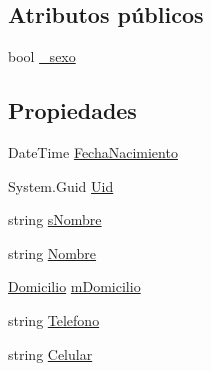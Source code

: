 \subsection*{Atributos públicos}
\begin{DoxyCompactItemize}
\item 
bool \hyperlink{class_proyecto___integrador__3_1_1_tipos_dato_1_1_usuario_a1a0f91fb9a1e9b12a534a31295531498}{\-\_\-sexo}
\end{DoxyCompactItemize}
\subsection*{Propiedades}
\begin{DoxyCompactItemize}
\item 
Date\-Time \hyperlink{class_proyecto___integrador__3_1_1_tipos_dato_1_1_usuario_acb7c4051a5323df336c32d932b5e83bb}{Fecha\-Nacimiento}
\item 
System.\-Guid \hyperlink{class_proyecto___integrador__3_1_1_tipos_dato_1_1_usuario_ae9cfa8c8b462028b8c166f7a1eff5f1f}{Uid}
\item 
string \hyperlink{class_proyecto___integrador__3_1_1_tipos_dato_1_1_usuario_a22974b12ffb877b220ac230d9ce48615}{s\-Nombre}
\item 
string \hyperlink{class_proyecto___integrador__3_1_1_tipos_dato_1_1_usuario_a3e82a41aeb5d99fb13d1d69ed40b1cb9}{Nombre}
\item 
\hyperlink{struct_proyecto___integrador__3_1_1_tipos_dato_1_1_usuario_1_1_domicilio}{Domicilio} \hyperlink{class_proyecto___integrador__3_1_1_tipos_dato_1_1_usuario_aa5cabdf3a53f849c78040fc52b58d63f}{m\-Domicilio}
\item 
string \hyperlink{class_proyecto___integrador__3_1_1_tipos_dato_1_1_usuario_a576131d83803eab74ec85992416f1220}{Telefono}
\item 
string \hyperlink{class_proyecto___integrador__3_1_1_tipos_dato_1_1_usuario_aaf69133c2acd8387493608e39b5e4a2e}{Celular}

\end{DoxyCompactItemize}
